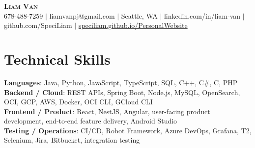 \documentclass[letterpaper,11pt]{article}
\begin{document}

%
\begin{center}
    \textbf{\Huge \scshape Liam Van} \\ \vspace{1pt}
    \small 678-488-7259 $|$ \small {liamvanpj@gmail.com} $|$ Seattle, WA
 {{$|$ linkedin.com/in/liam-van} {$|$ github.com/SpeciLiam} {$|$ \href{https://speciliam.github.io/PersonalWebsite}{speciliam.github.io/PersonalWebsite}}}

\end{center}

\section{Technical Skills}
 \begin{itemize}[leftmargin=0.15in, label={}]
    \small{\item{
     \textbf{Languages}{: Java, Python, JavaScript, TypeScript, SQL, C++, C\#, C, PHP} \\
     \textbf{Backend / Cloud}{: REST APIs, Spring Boot, Node.js, MySQL, OpenSearch, OCI, GCP, AWS, Docker, OCI CLI, GCloud CLI} \\
     \textbf{Frontend / Product}{: React, NestJS, Angular, user-facing product development, end-to-end feature delivery, Android Studio} \\
     \textbf{Testing / Operations}{: CI/CD, Robot Framework, Azure DevOps, Grafana, T2, Selenium, Jira, Bitbucket, integration testing} \\
    }}
 \end{itemize}
%
\end{document}
